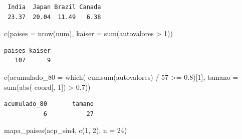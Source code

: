 \documentclass[oneside, openany, fontset=libertinus]{mitthesis}
\newenvironment{Shaded}{\begin{snugshade}}{\end{snugshade}}
\newcommand{\AttributeTok}[1]{\textcolor[rgb]{0.40,0.45,0.13}{#1}}
\newcommand{\DecValTok}[1]{\textcolor[rgb]{0.68,0.00,0.00}{#1}}
\newcommand{\FloatTok}[1]{\textcolor[rgb]{0.68,0.00,0.00}{#1}}
\newcommand{\FunctionTok}[1]{\textcolor[rgb]{0.28,0.35,0.67}{#1}}
\newcommand{\NormalTok}[1]{\textcolor[rgb]{0.00,0.23,0.31}{#1}}
\newcommand{\SpecialCharTok}[1]{\textcolor[rgb]{0.37,0.37,0.37}{#1}}
\newenvironment{codres}%
  {\par\smallskip\noindent\begin{minipage}[t]{0.57\linewidth}\vspace{0pt}}%
  {\end{minipage}\par\medskip}
\newcommand{\codressep}{\end{minipage}\hfill\begin{minipage}[t]{0.40\linewidth}\vspace{0pt}}
\begin{document}
\begin{verbatim}
 India  Japan Brazil Canada 
 23.37  20.04  11.49   6.38 
\end{verbatim}

\Needspace{3.23in}

\begin{codres}

\begin{Shaded}
\begin{Highlighting}[]
\FunctionTok{c}\NormalTok{(}\AttributeTok{paises =} \FunctionTok{nrow}\NormalTok{(num),}
  \AttributeTok{kaiser =} \FunctionTok{sum}\NormalTok{(autovalores }\SpecialCharTok{\textgreater{}} \DecValTok{1}\NormalTok{))}
\end{Highlighting}
\end{Shaded}

\codressep

\begin{verbatim}
paises kaiser 
   107      9 
\end{verbatim}

\end{codres}

\begin{codres}

\begin{Shaded}
\begin{Highlighting}[]
\FunctionTok{c}\NormalTok{(}\AttributeTok{acumulado\_80 =} \FunctionTok{which}\NormalTok{(}
  \FunctionTok{cumsum}\NormalTok{(autovalores) }\SpecialCharTok{/} \DecValTok{57}
    \SpecialCharTok{\textgreater{}=} \FloatTok{0.8}\NormalTok{)[}\DecValTok{1}\NormalTok{],}
  \AttributeTok{tamano =} \FunctionTok{sum}\NormalTok{(}\FunctionTok{abs}\NormalTok{(}
\NormalTok{    coord[, }\DecValTok{1}\NormalTok{]) }\SpecialCharTok{\textgreater{}} \FloatTok{0.7}\NormalTok{))}
\end{Highlighting}
\end{Shaded}

\codressep

\begin{verbatim}
acumulado_80       tamano 
           6           27 
\end{verbatim}

\end{codres}

\Needspace{4.89in}

\begin{Shaded}
\begin{Highlighting}[]
\FunctionTok{mapa\_paises}\NormalTok{(acp\_sin4, }\FunctionTok{c}\NormalTok{(}\DecValTok{1}\NormalTok{, }\DecValTok{2}\NormalTok{), }\AttributeTok{n =} \DecValTok{24}\NormalTok{)}
\end{Highlighting}
\end{Shaded}
\end{document}
